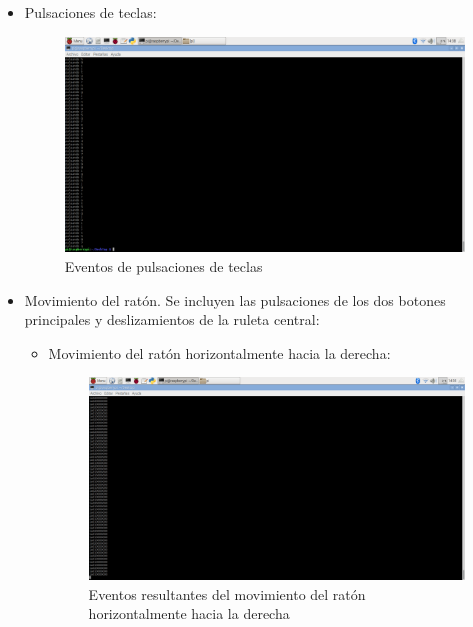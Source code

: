 \begin{itemize}
    \item Pulsaciones de teclas:\\
    
    \begin{figure}
    \centering
    \includegraphics[scale = 0.25]{capitulo_04/figuras_dir/teclas.jpg}
    \caption{Eventos de pulsaciones de teclas}
    \end{figure}

    \item Movimiento del ratón. Se incluyen las pulsaciones de los dos botones principales y deslizamientos de la ruleta central:\\
    
    \begin{itemize}
        \item Movimiento del ratón horizontalmente hacia la derecha:
        
            \begin{figure}
            \centering
            \includegraphics[scale = 0.25]{capitulo_04/figuras_dir/derecha.jpg}
            \caption{Eventos resultantes del movimiento del ratón horizontalmente hacia la derecha}
            \end{figure}
        

\end{itemize}
\end{itemize}
